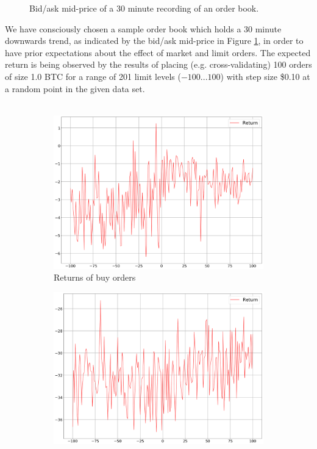 \begin{figure}[H]
    \centering
    \caption{Bid/ask mid-price of a 30 minute recording of an order book.}
    \label{fig:behaviour-price}
\end{figure}
We have consciously chosen a sample order book which holds a 30 minute downwards trend, as indicated by the bid/ask mid-price in Figure \ref{fig:behaviour-price}, in order to have prior expectations about the effect of market and limit orders.
The expected return is being observed by the results of placing (e.g. cross-validating) 100 orders of size 1.0 BTC for a range of 201 limit levels ($-100...100$) with step size \$0.10 at a random point in the given data set.
\\
\\
\begin{figure}[H]
    \centering
    \begin{subfigure}[b]{0.45\textwidth}
        \includegraphics[width=\textwidth]{images/behaviour-10s-buy.png}
        \caption{Returns of buy orders}
        \label{fig:behvaiour-10s-buy}
    \end{subfigure}
    \begin{subfigure}[b]{0.45\textwidth}
        \includegraphics[width=\textwidth]{images/behaviour-10s-sell.png}

\end{subfigure}
\end{figure}
